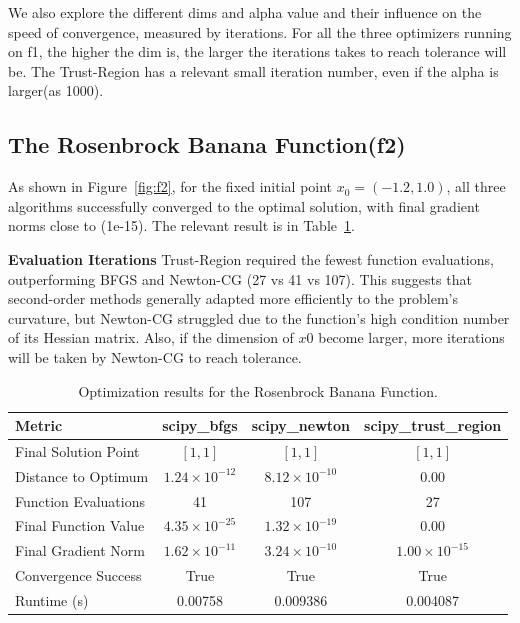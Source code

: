 \documentclass[12pt]{article}
\begin{document}
We also explore the different dims and alpha value and their influence on the speed of convergence, measured by iterations. For all the three optimizers running on f1, the higher the dim is, the larger the iterations takes to reach tolerance will be. The Trust-Region has a relevant small iteration number, even if the alpha is larger(as 1000).


\subsection{The Rosenbrock Banana Function(f2)}

As shown in Figure~\ref{fig:f2}, for the fixed initial point $x_0=(-1.2,1.0)$, all three algorithms successfully converged to the optimal solution, with final gradient norms close to (1e-15). The relevant result is in Table~\ref{tab:f2}.


\textbf{Evaluation Iterations}  
Trust-Region required the fewest function evaluations, outperforming BFGS and Newton-CG (27 vs 41 vs 107). This suggests that second-order methods generally adapted more efficiently to the problem’s curvature, but Newton-CG struggled due to the function's high condition number of its Hessian matrix. Also, if the dimension of $x0$ become larger, more iterations will be taken by Newton-CG to reach tolerance.


\begin{table}[h]
    \centering
\begin{tabular}{lccc}
    \toprule
    Metric & scipy\_bfgs & scipy\_newton & scipy\_trust\_region \\
    \midrule
    Final Solution Point & $[1, 1]$ & $[1, 1]$ & $[1, 1]$ \\
    Distance to Optimum & $1.24\times10^{-12}$ & $8.12\times10^{-10}$ & $0.00$ \\
    Function Evaluations & 41 & 107 & 27 \\
    Final Function Value & $4.35\times10^{-25}$ & $1.32\times10^{-19}$ & $0.00$ \\
    Final Gradient Norm & $1.62\times10^{-11}$ & $3.24\times10^{-10}$ & $1.00\times10^{-15}$ \\
    Convergence Success & True & True & True \\
    Runtime (s) & 0.00758 & 0.009386 & 0.004087 \\
    \bottomrule
\end{tabular}
    \caption{Optimization results for the Rosenbrock Banana Function.}
    \label{tab:f2}
\end{table}
\end{document}
